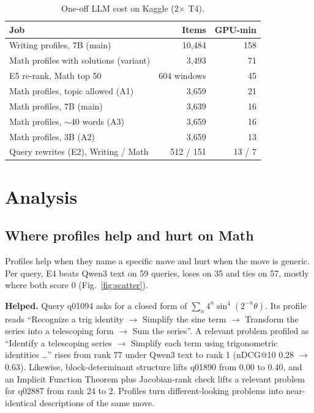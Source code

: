 \documentclass[conference]{IEEEtran}
\begin{document}
\begin{table}[t]
\centering
\caption{One-off LLM cost on Kaggle (2$\times$ T4).}
\label{tab:cost}
\footnotesize
\begin{tabular}{@{}lrr@{}}
\toprule
Job & Items & GPU-min \\
\midrule
Writing profiles, 7B (main) & 10,484 & 158 \\
Math profiles with solutions (variant) & 3,493 & 71 \\
E5 re-rank, Math top 50 & 604 windows & 45 \\
Math profiles, topic allowed (A1) & 3,659 & 21 \\
Math profiles, 7B (main) & 3,639 & 16 \\
Math profiles, $\sim$40 words (A3) & 3,659 & 16 \\
Math profiles, 3B (A2) & 3,659 & 13 \\
Query rewrites (E2), Writing / Math & 512 / 151 & 13 / 7 \\
\bottomrule
\end{tabular}
\end{table}

\section{Analysis}

\subsection{Where profiles help and hurt on Math}
Profiles help when they name a specific move and hurt when the move is generic. Per query, E4 beats Qwen3 text on 59 queries, loses on 35 and ties on 57, mostly where both score 0 (Fig.~\ref{fig:scatter}).

\textbf{Helped.} Query q01094 asks for a closed form of $\sum_n 4^n\sin^4(2^{-n}\theta)$. Its profile reads ``Recognize a trig identity $\rightarrow$ Simplify the sine term $\rightarrow$ Transform the series into a telescoping form $\rightarrow$ Sum the series''. A relevant problem profiled as ``Identify a telescoping series $\rightarrow$ Simplify each term using trigonometric identities \ldots'' rises from rank 77 under Qwen3 text to rank 1 (nDCG@10 0.28 $\rightarrow$ 0.63). Likewise, block-determinant structure lifts q01890 from 0.00 to 0.40, and an Implicit Function Theorem plus Jacobian-rank check lifts a relevant problem for q02887 from rank 24 to 2. Profiles turn different-looking problems into near-identical descriptions of the same move.
\end{document}
